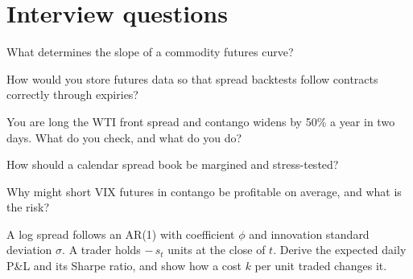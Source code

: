 \section{Interview questions}

\begin{interviewq}\label{iq:s1:calendar-spreads-and-curve-trades:1}
What determines the slope of a commodity futures curve?
\end{interviewq}

\begin{interviewq}\label{iq:s1:calendar-spreads-and-curve-trades:2}
How would you store futures data so that spread backtests follow contracts correctly through expiries?
\end{interviewq}

\begin{interviewq}\label{iq:s1:calendar-spreads-and-curve-trades:3}
You are long the WTI front spread and contango widens by 50\% a year in two days. What do you check, and what do you do?
\end{interviewq}

\begin{interviewq}\label{iq:s1:calendar-spreads-and-curve-trades:4}
How should a calendar spread book be margined and stress-tested?
\end{interviewq}

\begin{interviewq}\label{iq:s1:calendar-spreads-and-curve-trades:5}
Why might short VIX futures in contango be profitable on average, and what is the risk?
\end{interviewq}

\begin{interviewq}\label{iq:s1:calendar-spreads-and-curve-trades:6}
A log spread follows an AR(1) with coefficient $\phi$ and innovation standard deviation $\sigma$. A trader holds $-\,s_t$ units at the close of $t$.
Derive the expected daily P\&L and its Sharpe ratio, and show how a cost $k$ per unit traded changes it.
\end{interviewq}
